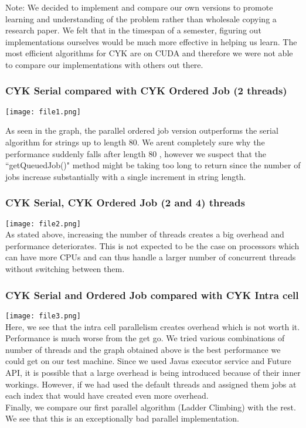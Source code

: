 \documentclass[12pt]{article}
\begin{document}
Note: We decided to implement and compare our own versions to promote learning and understanding of the problem rather than wholesale copying a research paper. We felt that in the timespan of a semester, figuring out implementations ourselves would be much more effective in helping us learn. The most efficient algorithms for CYK are on CUDA and therefore we were not able to compare our implementations with others out there.
\subsubsection{CYK Serial compared with CYK Ordered Job (2 threads)}

\texttt{[image: file1.png]}

\vspace{30 mm}
As seen in the graph, the parallel ordered job version outperforms the serial algorithm for strings up to length 80. We aren\textsc{}t completely sure why the performance suddenly falls after length 80 , however we suspect that the ``getQueuedJob()" method might be taking too long to return since the number of jobs increase substantially with a single increment in string length. \\
\subsubsection{CYK Serial, CYK Ordered Job (2 and 4) threads}

\texttt{[image: file2.png]}\\

As stated above, increasing the number of threads creates a big overhead and performance deteriorates. This is not expected to be the case on processors which can have more CPUs and can thus handle a larger number of concurrent threads without switching between them.
                             
\subsubsection{CYK Serial and Ordered Job compared with CYK Intra cell}

\texttt{[image: file3.png]}\\
Here, we see that the intra cell parallelism creates overhead which is not worth it. Performance is much worse from the get go. We tried various combinations of number of threads and the graph obtained above is the best performance we could get on our test machine. Since we used Java\textsc{}s executor service and Future API, it is possible that a large overhead is being introduced because of their inner workings. However, if we had used the default threads and assigned them jobs at each index that would have created even more overhead. \\
Finally, we compare our first parallel algorithm (Ladder Climbing) with the rest. We see that this is an exceptionally bad parallel implementation.\\
\end{document}
